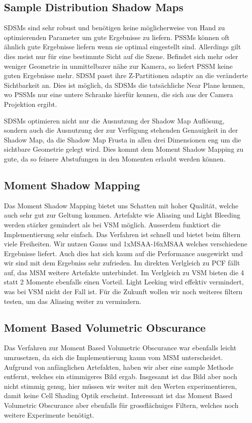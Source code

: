 \documentclass[runningheaders,a4paper]{llncs}
\begin{document}
\subsection{Sample Distribution Shadow Maps}
SDSMs sind sehr robust und benötigen keine möglicherweise von Hand zu optimierenden Parameter um gute Ergebnisse zu liefern.
PSSMs können oft ähnlich gute Ergebnisse liefern wenn sie optimal eingestellt sind.
Allerdings gilt dies meist nur für eine bestimmte Sicht auf die Szene.
Befindet sich mehr oder weniger Geometrie in unmittelbarer nähe zur Kamera, so liefert PSSM keine guten Ergebnisse mehr.
SDSM passt ihre Z-Partitionen adaptiv an die veränderte Sichtbarkeit an.
Dies ist möglich, da SDSMs die tatsächliche Near Plane kennen, wo PSSMs nur eine untere Schranke hierfür kennen, die sich aus der Camera Projektion ergibt.

SDSMs optimieren nicht nur die Ausnutzung der Shadow Map Auflösung, sondern auch die Ausnutzung der zur Verfügung stehenden Genauigkeit in der Shadow Map, da die Shadow Map Frusta in allen drei Dimensionen eng um die sichtbare Geometrie gelegt wird.
Dies kommt dem Moment Shadow Mapping zu gute, da so feinere Abstufungen in den Momenten erlaubt werden können.


\subsection{Moment Shadow Mapping}
Das Moment Shadow Mapping bietet uns Schatten mit hoher Qualität, welche auch sehr gut zur Geltung kommen. Artefakte wie Aliasing und Light Bleeding werden stärker gemindert als bei VSM möglich. Ausserdem funktiort die Implementierung sehr einfach. Das Verfahren ist schnell und bietet beim filtern viele Freiheiten. Wir nutzen Gauss und 1xMSAA-16xMSAA welches verschiedene Ergebnisse liefert.
Auch dies hat sich kaum auf die Performance ausgewirkt und wir sind mit dem Ergebniss sehr zufrieden.
Im direkten Verlgleich zu PCF fällt auf, das MSM weitere Artefakte unterbindet. Im Verlgleich zu VSM bieten die 4 statt 2 Momente ebenfalls einen Vorteil. Light Leeking wird effektiv vermindert, was bei VSM nicht der Fall ist.
Für die Zukunft wollen wir noch weiteres filtern testen, um das Aliasing weiter zu vermindern.


\subsection{Moment Based Volumetric Obscurance}
Das Verfahren zur Moment Based Volumetric Obscurance war ebenfalls leicht umzusetzen, da sich die Implementierung kaum vom MSM unterscheidet. Aufgrund von anfänglichen Artefakten, haben wir aber eine sample Methode entfernt, welches ein stimmigeres Bild ergab. Insgesamt ist das Bild aber noch nicht stimmig genug, hier müssen wir weiter mit den Werten experimentieren, damit keine Cell Shading Optik erscheint. Interessant ist das Moment Based Volumetric Obscurance aber ebenfalls für grossflächuiges Filtern, welches noch weitere Experimente benötigt.





\end{document}
